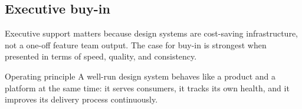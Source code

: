 \subsection{Executive buy-in}
Executive support matters because design systems are cost-saving infrastructure, not a one-off feature team output. The case for buy-in is strongest when presented in terms of speed, quality, and consistency.

\begin{highlightbox}{Operating principle}
A well-run design system behaves like a product and a platform at the same time: it serves consumers, it tracks its own health, and it improves its delivery process continuously.
\end{highlightbox}
